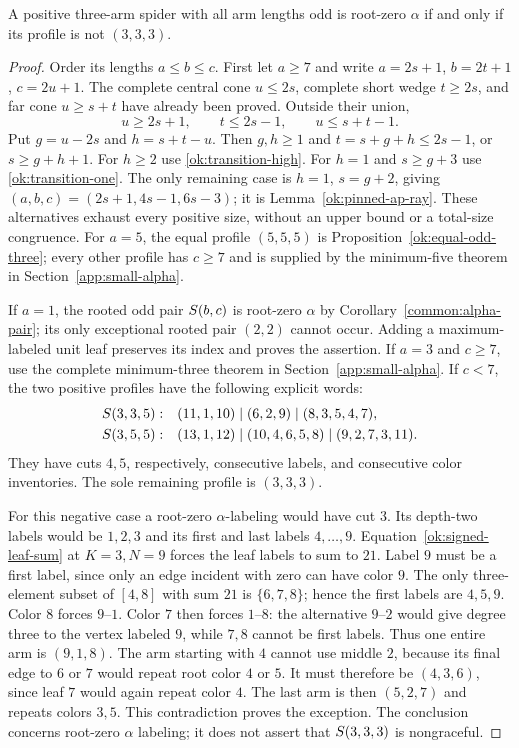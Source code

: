 \begin{theorem}\label{ok:all-odd-theorem}
A positive three-arm spider with all arm lengths odd is root-zero
$\alpha$ if and only if its profile is not $(3,3,3)$.
\end{theorem}
\begin{proof}
Order its lengths $a\le b\le c$.
First let $a\ge7$ and write $a=2s+1$, $b=2t+1$, $c=2u+1$.
The complete central cone $u\le2s$, complete short wedge
$t\ge2s$, and far cone $u\ge s+t$ have already been proved.
Outside their union,
\[
 u\ge2s+1,\qquad t\le2s-1,\qquad u\le s+t-1.
 \]
Put $g=u-2s$ and $h=s+t-u$. Then $g,h\ge1$ and
$t=s+g+h\le2s-1$, or $s\ge g+h+1$.
For $h\ge2$ use \eqref{ok:transition-high}.
For $h=1$ and $s\ge g+3$ use \eqref{ok:transition-one}.
The only remaining case is $h=1$, $s=g+2$, giving
$(a,b,c)=(2s+1,4s-1,6s-3)$; it is
Lemma~\ref{ok:pinned-ap-ray}. These alternatives exhaust every
positive size, without an upper bound or a total-size congruence.
For $a=5$, the equal profile $(5,5,5)$ is
Proposition~\ref{ok:equal-odd-three}; every other profile has
$c\ge7$ and is supplied by the minimum-five theorem in
Section~\ref{app:small-alpha}.

If $a=1$, the rooted odd pair $S\!\left(b,c\right)$ is root-zero
$\alpha$ by Corollary~\ref{common:alpha-pair}; its only exceptional
rooted pair $(2,2)$ cannot occur. Adding a maximum-labeled unit
leaf preserves its index and proves the assertion.
If $a=3$ and $c\ge7$, use the complete minimum-three theorem
in Section~\ref{app:small-alpha}. If $c<7$, the two positive
profiles have the following explicit words:
\begin{align*}
 S\!\left(3,3,5\right):&
 \quad(11,1,10)\mid(6,2,9)\mid(8,3,5,4,7),\\
 S\!\left(3,5,5\right):&
 \quad(13,1,12)\mid(10,4,6,5,8)\mid(9,2,7,3,11).
\end{align*}
They have cuts $4,5$, respectively, consecutive labels, and
consecutive color inventories. The sole remaining profile is
$(3,3,3)$.

For this negative case a root-zero $\alpha$-labeling would have
cut $3$. Its depth-two labels would be $1,2,3$ and its first and
last labels $4,\ldots,9$. Equation~\eqref{ok:signed-leaf-sum}
at $K=3,N=9$ forces the leaf labels to sum to $21$.
Label $9$ must be a first label, since only an edge incident with
zero can have color $9$. The only three-element subset of
$[4,8]$ with sum $21$ is $\{6,7,8\}$; hence the first labels
are $4,5,9$.
Color $8$ forces $9$--$1$. Color $7$ then forces $1$--$8$:
the alternative $9$--$2$ would give degree three to the vertex
labeled $9$, while $7,8$ cannot be first labels.
Thus one entire arm is $(9,1,8)$.
The arm starting with $4$ cannot use middle $2$, because its final
edge to $6$ or $7$ would repeat root color $4$ or $5$.
It must therefore be $(4,3,6)$, since leaf $7$ would again repeat
color $4$. The last arm is then $(5,2,7)$ and repeats colors
$3,5$. This contradiction proves the exception.
The conclusion concerns root-zero $\alpha$ labeling; it does not
assert that $S\!\left(3,3,3\right)$ is nongraceful.
\end{proof}

